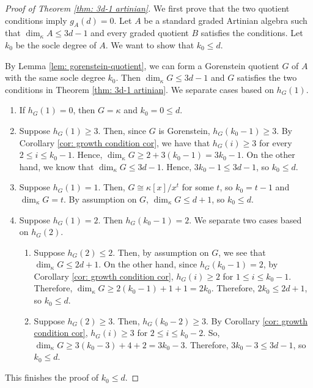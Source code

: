 \documentclass[11pt]{amsart}
\theoremstyle{definition}
\newcommand{\dimk}{\dim_{\kappa}}
\begin{document}
\begin{proof}[Proof of Theorem \ref{thm: 3d-1 artinian}]


\noindent We first prove that the two quotient conditions imply $g_A(d)=0$. Let $A$ be a standard graded Artinian algebra such that $\dim_{\kappa}A \leq 3d-1$ and every graded quotient $B$ satisfies the conditions. Let $k_0$ be the socle degree of $A$. We want to show that $k_0 \leq d$. 

By Lemma \ref{lem: gorenstein-quotient}, we can form a Gorenstein quotient $G$ of $A$ with the same socle degree $k_0$. Then $\dim_{\kappa}G \leq 3d-1$ and $G$ satisfies the two conditions in Theorem \ref{thm: 3d-1 artinian}. We separate cases based on $h_G(1)$.
\begin{enumerate}
    \item If $h_G(1)=0$, then $G=\kappa$ and $k_0=0\leq d$.
    \item Suppose $h_G(1) \geq 3$. Then, since $G$ is Gorenstein, $h_G(k_0-1) \geq 3$. By Corollary \ref{cor: growth condition cor}, we have that $h_G(i) \geq 3$ for every $2 \leq i \leq k_0-1$. Hence, $\dimk G \geq 2+3(k_0-1)=3k_0-1$. On the other hand, we know that $\dimk G \leq 3d-1$. Hence, $3k_0-1 \leq 3d-1$, so $k_0 \leq d$.
    \item Suppose $h_G(1)=1$. Then, $G \cong \kappa[x]/x^t$ for some $t$, so $k_0=t-1$ and $\dimk G=t$. By assumption on $G$, $\dimk G \leq d+1$, so $k_0 \leq d$. 
    \item Suppose $h_G(1)=2$. Then $h_G(k_0-1)=2$. We separate two cases based on $h_G(2)$.
    \begin{enumerate}
        \item Suppose $h_G(2) \leq 2$. Then, by assumption on $G$, we see that $\dimk G \leq 2d+1$. On the other hand, since  $h_G(k_0-1)=2$, by Corollary \ref{cor: growth condition cor}, $h_G(i) \geq 2$ for $1 \leq i \leq k_0-1$. Therefore, $\dimk G \geq 2(k_0-1)+1+1=2k_0$. Therefore, $2k_0 \leq 2d+1$, so $k_0 \leq d$.
        \item Suppose $h_G(2) \geq 3$. Then, $h_G(k_0-2) \geq 3$. By Corollary \ref{cor: growth condition cor}, $h_G(i) \geq 3$ for $2 \leq i \leq k_0-2$. So, $\dimk G \geq 3(k_0-3)+4+2 =3k_0-3$. Therefore, $3k_0 -3 \leq 3d-1$, so $k_0 \leq d$.
    \end{enumerate}
\end{enumerate} This finishes the proof of $k_0 \leq d$.


\end{proof}
\end{document}
